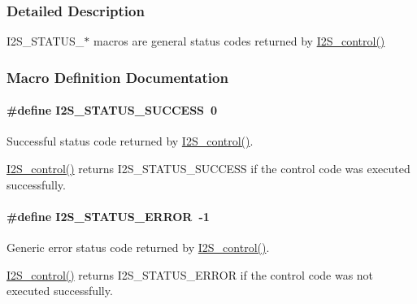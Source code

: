 \subsubsection{Detailed Description}
I2\+S\+\_\+\+S\+T\+A\+T\+U\+S\+\_\+$\ast$ macros are general status codes returned by \hyperlink{_i2_s_8h_a1af19b22e9036bee696b4e4efe4916b0}{I2\+S\+\_\+control()} 

\subsubsection{Macro Definition Documentation}
\paragraph[{I2\+S\+\_\+\+S\+T\+A\+T\+U\+S\+\_\+\+S\+U\+C\+C\+E\+S\+S}]{\setlength{\rightskip}{0pt plus 5cm}\#define I2\+S\+\_\+\+S\+T\+A\+T\+U\+S\+\_\+\+S\+U\+C\+C\+E\+S\+S~0}\label{group___i2_s___s_t_a_t_u_s_ga23118b46858671b6537d3a68721f0282}


Successful status code returned by \hyperlink{_i2_s_8h_a1af19b22e9036bee696b4e4efe4916b0}{I2\+S\+\_\+control()}. 

\hyperlink{_i2_s_8h_a1af19b22e9036bee696b4e4efe4916b0}{I2\+S\+\_\+control()} returns I2\+S\+\_\+\+S\+T\+A\+T\+U\+S\+\_\+\+S\+U\+C\+C\+E\+S\+S if the control code was executed successfully. 
\paragraph[{I2\+S\+\_\+\+S\+T\+A\+T\+U\+S\+\_\+\+E\+R\+R\+O\+R}]{\setlength{\rightskip}{0pt plus 5cm}\#define I2\+S\+\_\+\+S\+T\+A\+T\+U\+S\+\_\+\+E\+R\+R\+O\+R~-\/1}\label{group___i2_s___s_t_a_t_u_s_ga775a6dc5aa644d4cca2179afbafb63ad}


Generic error status code returned by \hyperlink{_i2_s_8h_a1af19b22e9036bee696b4e4efe4916b0}{I2\+S\+\_\+control()}. 

\hyperlink{_i2_s_8h_a1af19b22e9036bee696b4e4efe4916b0}{I2\+S\+\_\+control()} returns I2\+S\+\_\+\+S\+T\+A\+T\+U\+S\+\_\+\+E\+R\+R\+O\+R if the control code was not executed successfully. 
